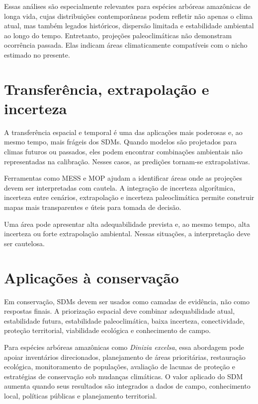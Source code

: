 Essas análises são especialmente relevantes para espécies arbóreas amazônicas de longa vida, cujas distribuições contemporâneas podem refletir não apenas o clima atual, mas também legados históricos, dispersão limitada e estabilidade ambiental ao longo do tempo. Entretanto, projeções paleoclimáticas não demonstram ocorrência passada. Elas indicam áreas climaticamente compatíveis com o nicho estimado no presente.

\section{Transferência, extrapolação e incerteza}

A transferência espacial e temporal é uma das aplicações mais poderosas e, ao mesmo tempo, mais frágeis dos SDMs. Quando modelos são projetados para climas futuros ou passados, eles podem encontrar combinações ambientais não representadas na calibração. Nesses casos, as predições tornam-se extrapolativas.

Ferramentas como MESS e MOP ajudam a identificar áreas onde as projeções devem ser interpretadas com cautela. A integração de incerteza algorítmica, incerteza entre cenários, extrapolação e incerteza paleoclimática permite construir mapas mais transparentes e úteis para tomada de decisão.

\begin{atencao}[title={\faExclamationTriangle\quad Alta adequabilidade não significa alta confiança}]
	Uma área pode apresentar alta adequabilidade prevista e, ao mesmo tempo, alta incerteza ou forte extrapolação ambiental. Nessas situações, a interpretação deve ser cautelosa.
\end{atencao}

\section{Aplicações à conservação}

Em conservação, SDMs devem ser usados como camadas de evidência, não como respostas finais. A priorização espacial deve combinar adequabilidade atual, estabilidade futura, estabilidade paleoclimática, baixa incerteza, conectividade, proteção territorial, viabilidade ecológica e conhecimento de campo.

Para espécies arbóreas amazônicas como \textit{Dinizia excelsa}, essa abordagem pode apoiar inventários direcionados, planejamento de áreas prioritárias, restauração ecológica, monitoramento de populações, avaliação de lacunas de proteção e estratégias de conservação sob mudanças climáticas. O valor aplicado do SDM aumenta quando seus resultados são integrados a dados de campo, conhecimento local, políticas públicas e planejamento territorial.

